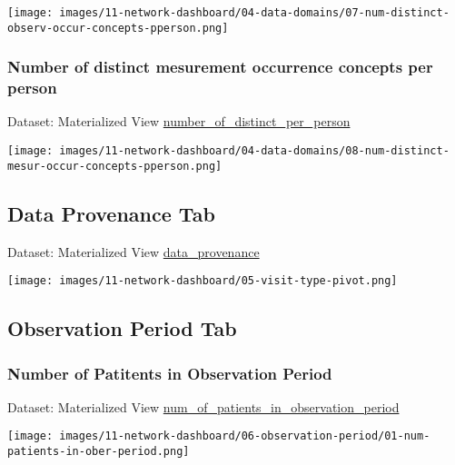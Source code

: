 \documentclass[
]{book}
\begin{document}
\texttt{[image: images/11-network-dashboard/04-data-domains/07-num-distinct-observ-occur-concepts-pperson.png]}

\hypertarget{number-of-distinct-mesurement-occurrence-concepts-per-person}{%
\subsubsection*{Number of distinct mesurement occurrence concepts per person}\label{number-of-distinct-mesurement-occurrence-concepts-per-person}}

Dataset: Materialized View \href{materialized-views-1.html\#number_of_distinct_per_person}{number\_of\_distinct\_per\_person}

\texttt{[image: images/11-network-dashboard/04-data-domains/08-num-distinct-mesur-occur-concepts-pperson.png]}

\hypertarget{data-provenance-tab}{%
\subsection*{Data Provenance Tab}\label{data-provenance-tab}}

Dataset: Materialized View \href{materialized-views-1.html\#data_provenance}{data\_provenance}

\texttt{[image: images/11-network-dashboard/05-visit-type-pivot.png]}

\hypertarget{observation-period-tab}{%
\subsection*{Observation Period Tab}\label{observation-period-tab}}

\hypertarget{number-of-patitents-in-observation-period}{%
\subsubsection*{Number of Patitents in Observation Period}\label{number-of-patitents-in-observation-period}}

Dataset: Materialized View \href{materialized-views-1.html\#num_of_patients_in_observation_period}{num\_of\_patients\_in\_observation\_period}

\texttt{[image: images/11-network-dashboard/06-observation-period/01-num-patients-in-ober-period.png]}
\end{document}
